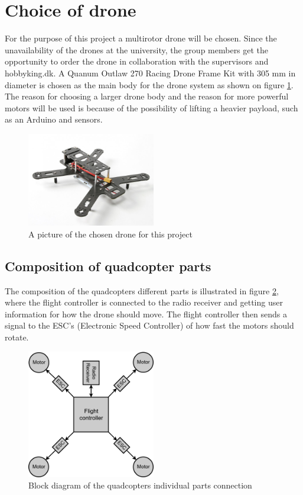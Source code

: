 \section{Choice of drone}\label{s:vores_drone}
For the purpose of this project a multirotor drone will be chosen. Since the unavailability of the drones at the university, the group members get the opportunity to order the drone in collaboration with the supervisors and hobbyking.dk. A Quanum Outlaw 270 Racing Drone Frame Kit with 305 mm in diameter is chosen as the main body for the drone system as shown on figure \ref{fig:TheChosenOne}. The reason for choosing a larger drone body and the reason for more powerful motors will be used is because of the possibility of lifting a heavier payload, such as an Arduino and sensors. 

\begin{figure}[H]
    \centering
    \includegraphics[width=0.5\textwidth]{figures/ch_intro/TheChosenOne.jpg}
    \caption{A picture of the chosen drone for this project}
    \label{fig:TheChosenOne}
\end{figure}

\subsection*{Composition of quadcopter parts}
The composition of the quadcopters different parts is illustrated in figure \ref{fig:blockdiagramDrone}, where the flight controller is connected to the radio receiver and getting user information for how the drone should move. The flight controller then sends a signal to the ESC’s (Electronic Speed Controller) of how fast the motors should rotate.

\begin{figure}[H]
    \centering
    \includegraphics[width=0.5\textwidth]{figures/ch_intro/BlockdiagramOfTheDrone.png}
    \caption{Block diagram of the quadcopters individual parts connection}
    \label{fig:blockdiagramDrone}
\end{figure}

